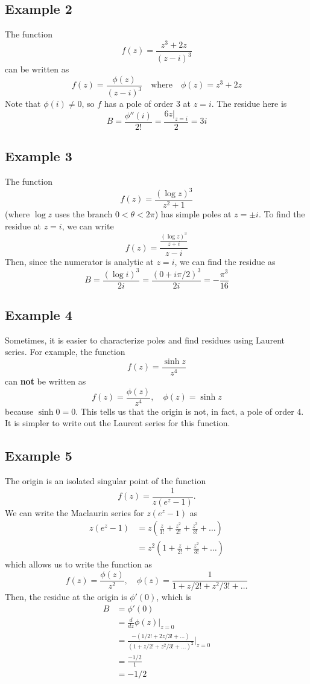 \documentclass{article}
\renewcommand{\emph}{\textbf}
\begin{document}
\subsection{Example 2}
The function
\[
	f(z) = \frac{z^3 + 2z}{(z - i)^3}
\]
can be written as
\[
	f(z) = \frac{\phi(z)}{(z - i)^3} \quad \text{where} \quad
	\phi(z) = z^3 + 2z
\]
Note that $\phi(i) \neq 0$, so $f$ has a pole of order $3$ at $z = i$. The residue here is
\[
	B = \frac{\phi''(i)}{2!}
	= \frac{6z |_{z = i}}{2}
	= 3i
\]

\subsection{Example 3}
The function 
\[
	f(z) = \frac{(\log z)^3}{z^2 + 1}
\]
(where $\log z$ uses the branch $0 < \theta < 2\pi$) has simple poles at $z = \pm i$. To find the residue at $z = i$, we can write
\[
	f(z) = \frac{\frac{(\log z)^3}{z + i}}{z - i}
\]
Then, since the numerator is analytic at $z = i$, we can find the residue as
\[
	B = \frac{(\log i)^3}{2i} 
	= \frac{(0 + i\pi/2)^3}{2i}
	= -\frac{\pi^3}{16}
\]

\subsection{Example 4}
Sometimes, it is easier to characterize poles and find residues using Laurent series. For example, the function
\[
	f(z) = \frac{\sinh z}{z^4}
\]
can \emph{not} be written as
\[
	f(z) = \frac{\phi(z)}{z^4},	\quad \phi(z) = \sinh z
\]
because $\sinh 0 = 0$. This tells us that the origin is not, in fact, a pole of order $4$. It is simpler to write out the Laurent series for this function.

\subsection{Example 5}
The origin is an isolated singular point of the function
\[
	f(z) = \frac{1}{z(e^z - 1)}.
\]
We can write the Maclaurin series for $z(e^z - 1)$ as
\begin{align*}
	z(e^z - 1)
	&= z\left( \frac{z}{1!} + \frac{z^2}{2!} + \frac{z^3}{3!} + \dots \right) \\
	&= z^2 \left( 1 + \frac{z}{2!} + \frac{z^2}{3!} + \dots \right)
\end{align*}
which allows us to write the function as
\[
	f(z) = \frac{\phi(z)}{z^2}, \quad
	\phi(z) = \frac{1}{1 + z/2! + z^2/3! + \dots}
\]
Then, the residue at the origin is $\phi'(0)$, which is
\begin{align*}
	B &=\phi'(0) \\
	&= \frac{d}{dz} \phi(z) \Big|_{z = 0} \\
	&= \frac{-(1/2! + 2z/3! + \dots)}{(1 + z/2! + z^2/3! + \dots)^2} \Big|_{z = 0} \\
	&= \frac{-1/2}{1}  \\
	&= -1/2
\end{align*}
\end{document}
